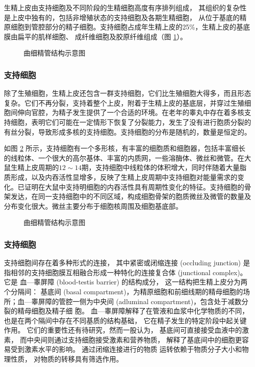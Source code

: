 生精上皮由支持细胞及不同阶段的生精细胞高度有序排列组成， 其组织的复杂性是上皮中独有的，包括非增殖状态的支持细胞及各期生精细胞， 从位于基底的精原细胞到管腔部分的精子细胞。支持细胞占成年生精上皮的25\%，生精上皮的基底膜由扁平的肌样细胞、 成纤维细胞及胶原纤维组成（图 \ref{figure_cell_alignment_of_serminiferous_epithelium}）。

\begin{figure}
\centering
\myFigurePlaceholder
\caption{曲细精管结构示意图}
\label{figure_cell_alignment_of_serminiferous_epithelium}
\end{figure}

\subsubsection{支持细胞}

除了生殖细胞，生精上皮还包含一群支持细胞，它们比生殖细胞大得多，而且形态复杂。它们不再分裂，支持着整个上皮，附着于生精上皮的基底层，并穿过生殖细胞间伸向官腔，为精子发生提供了一个合适的环境。在老年的睾丸中存在着多核支持细胞，表明它们可能在一定情形下恢复了分裂能力，发生了没有进行胞质分裂的有丝分裂，导致形成多核的支持细胞。支持细胞的分布是随机的，数量是恒定的。


如图 \ref{figure_structure_of_sertoli_cell} 所示，支持细胞有一个多形核，有丰富的细胞质和细胞器，包括丰富细长 的线粒体、一个很大的高尔基体、丰富的内质网，一些溶酶体、微丝和微管。在大鼠生精上皮周期的$ 12\sim 14 $期，支持细胞中线粒体的体积增大，同时伴随着大量脂质形成，以及内吞活性显增多，反映了生精上皮周期中支持细胞对能量需求的变化。已证明在大鼠中支持明细胞的内吞活性具有周期性变化的特征。支持细胞的骨架发达，在同一支持细胞中的不同区域，构成细胞骨架的胞质微丝及微管的数量及分布变化很大。微丝主要分布于细胞核周围及细胞基底部。

\begin{figure}
\centering
\myFigurePlaceholder
\caption{曲细精管结构示意图}
\label{figure_structure_of_sertoli_cell}
\end{figure}

\subsubsection{支持细胞}

支持细胞间存在着多种形式的连接， 其中紧密或闭缩连接 (occluding junction) 是指相邻的支持细胞膜互相融合形成一种特化的连接复合体 (junctional complex)。它是 血---睾屏障 (blood-testis barrier) 的结构成分， 这一结构把生精上皮分为两个分隔间： 基底间 (basal compartment)，为精原细胞和前细线期的精母细胞的场所；血---睾屏障的管腔一侧为中央间 (adluminal compartment)，包含处于减数分裂的精母细胞及精子细 胞。 血---睾屏障解释了在管液和血浆中化学物质的不同，也是在两个隔间中存在不同基质的结构基础， 它在精子发生的特定阶段中起关键作用。 它们的重要性还有待研究，然而一股认为， 基底间可直接接受血液中的激素， 而中央间则通过支持细胞接受激素和营养物质， 解释了基底间中的细胞更容易受到激素水平的影响。 通过闭缩连接进行的物质 运转依赖于物质分子大小和物理性质， 对物质的转移具有筛选作用。

